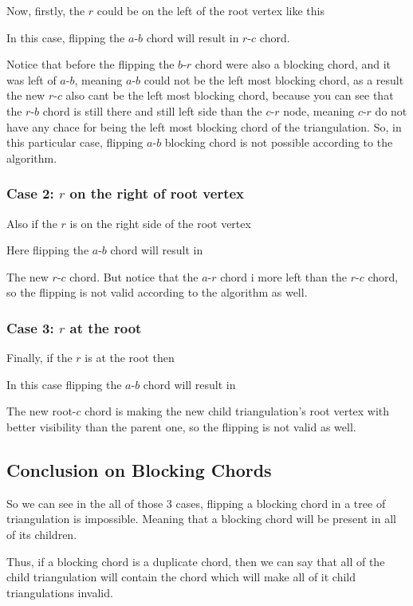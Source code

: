 \documentclass[12pt,a4paper]{article}
\begin{document}
Now, firstly, the $r$ could be on the left of the root vertex like this 

In this case, flipping the $a$-$b$ chord will result in $r$-$c$ chord.

Notice that before the flipping the $b$-$r$ chord were also a blocking chord, and it was left of $a$-$b$, meaning $a$-$b$ could not be the left most blocking chord, as a result the new $r$-$c$ also cant be the left most blocking chord, because you can see that the $r$-$b$ chord is still there and still left side than the $c$-$r$ node, meaning $c$-$r$ do not have any chace for being the left most blocking chord of the triangulation. So, in this particular case, flipping $a$-$b$ blocking chord is not possible according to the algorithm.

\subsubsection{Case 2: $r$ on the right of root vertex}

Also if the $r$ is on the right side of the root vertex 

Here flipping the $a$-$b$ chord will result in 

The new $r$-$c$ chord. But notice that the $a$-$r$ chord i more left than the $r$-$c$ chord, so the flipping is not valid according to the algorithm as well.

\subsubsection{Case 3: $r$ at the root}

Finally, if the $r$ is at the root then

In this case flipping the $a$-$b$ chord will result in 

The new root-$c$ chord is making the new child triangulation's root vertex with better visibility than the parent one, so the flipping is not valid as well.

\subsection{Conclusion on Blocking Chords}

So we can see in the all of those 3 cases, flipping a blocking chord in a tree of triangulation is impossible. Meaning that a blocking chord will be present in all of its children. 

Thus, if a blocking chord is a duplicate chord, then we can say that all of the child triangulation will contain the chord which will make all of it child triangulations invalid.
\end{document}
